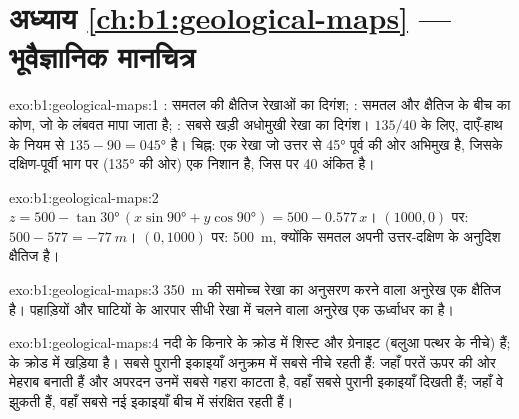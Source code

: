 \section*{अध्याय \ref{ch:b1:geological-maps} --- भूवैज्ञानिक मानचित्र}

\begin{solution}{exo:b1:geological-maps:1}
: समतल की क्षैतिज रेखाओं का दिगंश; : समतल और क्षैतिज के बीच का कोण, जो  के लंबवत मापा
जाता है; : सबसे खड़ी अधोमुखी रेखा का दिगंश। $135/40$ के लिए, दाएँ-हाथ के नियम से 
$135 - 90 = \ang{045}$ है। चिह्न: एक  रेखा जो उत्तर से \ang{45} पूर्व की ओर अभिमुख है, जिसके दक्षिण-पूर्वी
भाग पर (\ang{135} की ओर) एक निशान है, जिस पर 40 अंकित है।
\end{solution}

\begin{solution}{exo:b1:geological-maps:2}
$z = 500 - \tan\ang{30}\,(x\sin\ang{90} + y\cos\ang{90}) = 500 - 0.577\,x$।
$(1000, 0)$ पर: $500 - 577 = \qty{-77}{m}$। $(0, 1000)$ पर: \qty{500}{m}, क्योंकि समतल अपनी उत्तर-दक्षिण 
के अनुदिश क्षैतिज है।
\end{solution}

\begin{solution}{exo:b1:geological-maps:3}
\qty{350}{m} की समोच्च रेखा का अनुसरण करने वाला अनुरेख एक क्षैतिज  है। पहाड़ियों और घाटियों के आरपार सीधी
रेखा में चलने वाला अनुरेख एक ऊर्ध्वाधर  का है।
\end{solution}

\begin{solution}{exo:b1:geological-maps:4}
नदी के किनारे  के क्रोड में शिस्ट और ग्रेनाइट (बलुआ पत्थर के नीचे) हैं;  के क्रोड में खड़िया है।
सबसे पुरानी इकाइयाँ अनुक्रम में सबसे नीचे रहती हैं: जहाँ परतें ऊपर की ओर मेहराब बनाती हैं और अपरदन उनमें
सबसे गहरा काटता है, वहाँ सबसे पुरानी इकाइयाँ दिखती हैं; जहाँ वे झुकती हैं, वहाँ सबसे नई इकाइयाँ बीच में
संरक्षित रहती हैं।
\end{solution}

